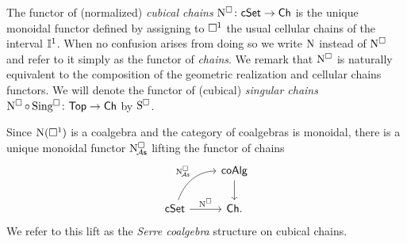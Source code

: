 The functor of (normalized) \textit{cubical chains} $\operatorname{N^{\square}} \colon \mathsf{cSet} \to \mathsf{Ch}$ is the unique monoidal functor defined by assigning to $\square^1$ the usual cellular chains of the interval $\mathbb{I}^1$.
When no confusion arises from doing so we write $\operatorname{N}$ instead of $\operatorname{N^{\square}}$ and refer to it simply as the functor of \textit{chains}.
We remark that $\operatorname{N^{\square}}$ is naturally equivalent to the composition of the geometric realization and cellular chains functors.
We will denote the functor of (cubical) \textit{singular chains} $\operatorname{N^{\square}} \circ \operatorname{Sing^{\square}} \colon \mathsf{Top} \to \mathsf{Ch}$ by $\operatorname{S^{\square}}$.

Since $\operatorname{N}(\square^1)$ is a coalgebra and the category of coalgebras is monoidal, there is a unique monoidal functor
$\operatorname{N^{\square}_{\!{\mathcal{A}\mathsf{s}}}}$ lifting the functor of chains
\[
\begin{tikzcd}
	& \coAlg \arrow[d] \\
	\cSet \arrow[r, "\cchains"] \arrow[ur, "\cchainsA", out=70, in=180] & \Ch.
\end{tikzcd}
\]
We refer to this lift as the \textit{Serre coalgebra} structure on cubical chains.

%
